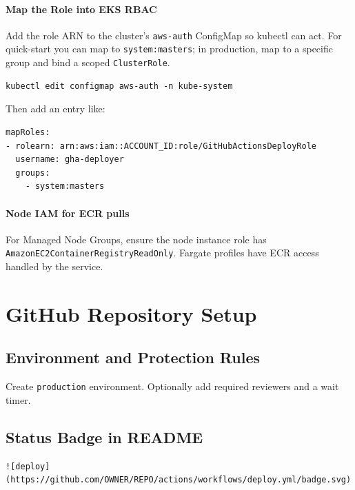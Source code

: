 \documentclass[11pt]{article}
\begin{document}
\paragraph{Map the Role into EKS RBAC}
Add the role ARN to the cluster's \texttt{aws-auth} ConfigMap so kubectl can act. For quick-start you can map to \texttt{system:masters}; in production, map to a specific group and bind a scoped \texttt{ClusterRole}.

\begin{verbatim}
kubectl edit configmap aws-auth -n kube-system
\end{verbatim}

Then add an entry like:
\begin{verbatim}
mapRoles:
- rolearn: arn:aws:iam::ACCOUNT_ID:role/GitHubActionsDeployRole
  username: gha-deployer
  groups:
    - system:masters
\end{verbatim}

\paragraph{Node IAM for ECR pulls}
For Managed Node Groups, ensure the node instance role has \texttt{AmazonEC2ContainerRegistryReadOnly}. Fargate profiles have ECR access handled by the service.

\section{GitHub Repository Setup}
\subsection{Environment and Protection Rules}
Create \texttt{production} environment. Optionally add required reviewers and a wait timer.

\subsection{Status Badge in README}
\begin{verbatim}
![deploy](https://github.com/OWNER/REPO/actions/workflows/deploy.yml/badge.svg)
\end{verbatim}
\clearpage
\end{document}
